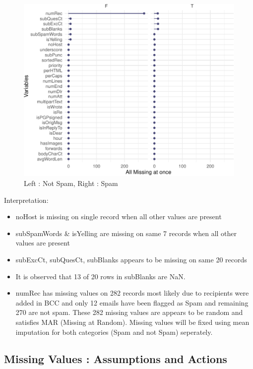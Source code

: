 \documentclass[
]{article}
\providecommand{\tightlist}{%
  \setlength{\itemsep}{0pt}\setlength{\parskip}{0pt}}
\begin{document}
\begin{figure}[H]

{\centering \includegraphics{case_study03_files/figure-latex/unnamed-chunk-9-1} 

}

\caption{Left : Not Spam, Right : Spam}\label{fig:unnamed-chunk-9}
\end{figure}

Interpretation:

\begin{itemize}
\tightlist
\item
  noHost is missing on single record when all other values are present
\item
  subSpamWords \& isYelling are missing on same 7 records when all other
  values are present
\item
  subExcCt, subQuesCt, subBlanks appears to be missing on same 20
  records
\item
  It is observed that 13 of 20 rows in subBlanks are NaN.
\item
  numRec has missing values on 282 records most likely due to recipients
  were added in BCC and only 12 emails have been flagged as Spam and
  remaining 270 are not spam. These 282 missing values are appears to be
  random and satisfies MAR (Missing at Random). Missing values will be
  fixed using mean imputation for both categories (Spam and not Spam)
  seperately.
\end{itemize}

\hypertarget{missing-values-assumptions-and-actions}{%
\subsection{Missing Values : Assumptions and
Actions}\label{missing-values-assumptions-and-actions}}
\end{document}
